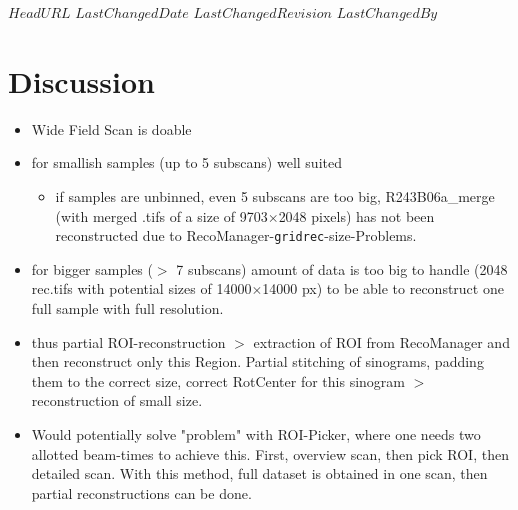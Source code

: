 \svnidlong
{$HeadURL$}
{$LastChangedDate$}
{$LastChangedRevision$}
{$LastChangedBy$}
\section{Discussion}
\begin{itemize}
	\item Wide Field Scan is doable
	\item for smallish samples (up to 5 subscans) well suited
	\begin{itemize}
		\item if samples are unbinned, even 5 subscans are too big, R243B06a\_merge (with merged .tifs of a size of 9703$\times$2048 pixels) has not been reconstructed due to RecoManager-\verb+gridrec+-size-Problems.
	\end{itemize}
	\item for bigger samples ($>$ 7 subscans) amount of data is too big to handle (2048 rec.tifs with potential sizes of 14000$\times$14000 px) to be able to reconstruct one full sample with full resolution.
	\item thus partial ROI-reconstruction $>$ extraction of ROI from RecoManager and then reconstruct only this Region. Partial stitching of sinograms, padding them to the correct size, correct RotCenter for this sinogram $>$ reconstruction of small size.
	\item Would potentially solve "problem" with ROI-Picker, where one needs two allotted beam-times to achieve this. First, overview scan, then pick ROI, then detailed scan. With this method, full dataset is obtained in one scan, then partial reconstructions can be done.
\end{itemize}